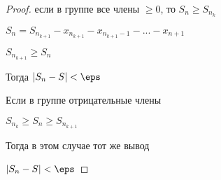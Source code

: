 \begin{theorem}
\begin{enumerate}
\begin{proof}
				если в группе все члены $\ge 0$, то $S_n \ge S_{n_k}$
		
				$S_n = S_{n_{k+1}} - x_{n_{k+1}} - x_{n_{k+1} - 1} - ... - x_{n+1}$
		
				$S_{n_{k+1}} \ge S_n$
		
				Тогда $|S_n - S| < \eps$
		
				Если в группе отрицательные члены
		
				$S_{n_k} \ge S_n \ge S_{n_{k+1}}$
		
				Тогда в этом случае тот же вывод

				$|S_n - S| < \eps$

			\end{proof}
	\end{enumerate}

\end{theorem}